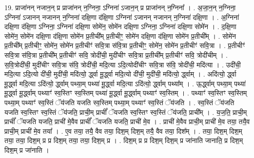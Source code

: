 \documentclass[17pt]{extarticle}
\begin{document}
19. प्राजा॑नन् नजान॒न् प्र प्राजा॑नन् न॒ग्निना॒ ऽग्निना॑ ऽजान॒न् प्र प्राजा॑नन् न॒ग्निना᳚ । . अ॒जा॒न॒न् न॒ग्निना॒ ऽग्निना॑ ऽजानन् नजानन् न॒ग्निना॑ दक्षि॒णा द॑क्षि॒णा ऽग्निना॑ ऽजानन् नजानन् न॒ग्निना॑ दक्षि॒णा । . अ॒ग्निना॑ दक्षि॒णा द॑क्षि॒णा ऽग्निना॒ ऽग्निना॑ दक्षि॒णा सोमे॑न॒ सोमे॑न दक्षि॒णा ऽग्निना॒ ऽग्निना॑ दक्षि॒णा सोमे॑न । . द॒क्षि॒णा सोमे॑न॒ सोमे॑न दक्षि॒णा द॑क्षि॒णा सोमे॑न प्र॒तीची᳚म् प्र॒तीचीꣳ॒॒ सोमे॑न दक्षि॒णा द॑क्षि॒णा सोमे॑न प्र॒तीची᳚म् । . सोमे॑न प्र॒तीची᳚म् प्र॒तीचीꣳ॒॒ सोमे॑न॒ सोमे॑न प्र॒तीचीꣳ॑ सवि॒त्रा स॑वि॒त्रा प्र॒तीचीꣳ॒॒ सोमे॑न॒ सोमे॑न प्र॒तीचीꣳ॑ सवि॒त्रा । . प्र॒तीचीꣳ॑ सवि॒त्रा स॑वि॒त्रा प्र॒तीची᳚म् प्र॒तीचीꣳ॑ सवि॒ त्रोदी॑ची॒ मुदी॑चीꣳ सवि॒त्रा प्र॒तीची᳚म् प्र॒तीचीꣳ॑ सवि॒ त्रोदी॑चीम् । . स॒वि॒त्रोदी॑ची॒ मुदी॑चीꣳ सवि॒त्रा स॑वि॒ त्रोदी॑ची॒ मदि॒त्या ऽदि॒त्योदी॑चीꣳ सवि॒त्रा स॑वि॒ त्रोदी॑ची॒ मदि॑त्या । . उदी॑ची॒ मदि॒त्या ऽदि॒त्यो दी॑ची॒ मुदी॑ची॒ मदि॑त्यो॒ र्द्ध्वा मू॒र्द्ध्वा मदि॒त्यो दी॑ची॒ मुदी॑ची॒ मदि॑त्यो॒ र्द्ध्वाम् । . अदि॑त्यो॒ र्द्ध्वा मू॒र्द्ध्वा मदि॒त्या ऽदि॑त्यो॒ र्द्ध्वाम् पथ्या॒म् पथ्या॑ मू॒र्द्ध्वा मदि॒त्या ऽदि॑त्यो॒ र्द्ध्वाम् पथ्या᳚म् । . ऊ॒र्द्ध्वाम् पथ्या॒म् पथ्या॑ मू॒र्द्ध्वा मू॒र्द्ध्वाम् पथ्याꣳ॑ स्व॒स्तिꣳ स्व॒स्तिम् पथ्या॑ मू॒र्द्ध्वा मू॒र्द्ध्वाम् पथ्याꣳ॑ स्व॒स्तिम् । . पथ्याꣳ॑ स्व॒स्तिꣳ स्व॒स्तिम् पथ्या॒म् पथ्याꣳ॑ स्व॒स्तिं ॅय॑जति यजति स्व॒स्तिम् पथ्या॒म् पथ्याꣳ॑ स्व॒स्तिं ॅय॑जति । . स्व॒स्तिं ॅय॑जति यजति स्व॒स्तिꣳ स्व॒स्तिं ॅय॑जति॒ प्राची॒म् प्राचीं᳚ ॅयजति स्व॒स्तिꣳ स्व॒स्तिं ॅय॑जति॒ प्राची᳚म् । . य॒ज॒ति॒ प्राची॒म् प्राचीं᳚ ॅयजति यजति॒ प्राची॑ मे॒वैव प्राचीं᳚ ॅयजति यजति॒ प्राची॑ मे॒व । . प्राची॑ मे॒वैव प्राची॒म् प्राची॑ मे॒व तया॒ तयै॒व प्राची॒म् प्राची॑ मे॒व तया᳚ । . ए॒व तया॒ तयै॒ वैव तया॒ दिश॒म् दिश॒म् तयै॒ वैव तया॒ दिश᳚म् । . तया॒ दिश॒म् दिश॒म् तया॒ तया॒ दिश॒म् प्र प्र दिश॒म् तया॒ तया॒ दिश॒म् प्र । . दिश॒म् प्र प्र दिश॒म् दिश॒म् प्र जा॑नाति जानाति॒ प्र दिश॒म् दिश॒म् प्र जा॑नाति । \newline
\end{document}
